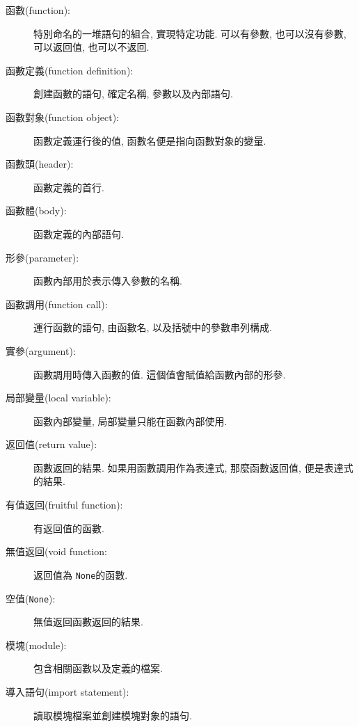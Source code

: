 \documentclass[10pt]{book}
\begin{document}
\begin{description}

\item[函數(function):] 特別命名的一堆語句的組合, 實現特定功能. 可以有參數, 
也可以沒有參數, 可以返回值, 也可以不返回. 

\item[函數定義(function definition):]  創建函數的語句, 確定名稱, 參數以及內部語句. 

\item[函數對象(function object):]  函數定義運行後的值, 函數名便是指向函數對象的變量. 

\item[函數頭(header):] 函數定義的首行.

\item[函數體(body):] 函數定義的內部語句.

\item[形參(parameter):] 函數內部用於表示傳入參數的名稱. 

\item[函數調用(function call):] 運行函數的語句, 由函數名, 以及括號中的參數串列構成. 

\item[實參(argument):]  函數調用時傳入函數的值. 這個值會賦值給函數內部的形參. 

\item[局部變量(local variable):]  函數內部變量, 局部變量只能在函數內部使用. 

\item[返回值(return value):]  函數返回的結果. 如果用函數調用作為表達式, 那麼函數返回值, 便是表達式的結果. 

\item[有值返回(fruitful function):] 有返回值的函數. 

\item[無值返回(void function:] 返回值為 {\tt None}的函數. 

\item[空值({\tt None}):] 無值返回函數返回的結果. 

\item[模塊(module):] 包含相關函數以及定義的檔案. 

\item[導入語句(import statement):] 讀取模塊檔案並創建模塊對象的語句. 


\end{description}
\end{document}
